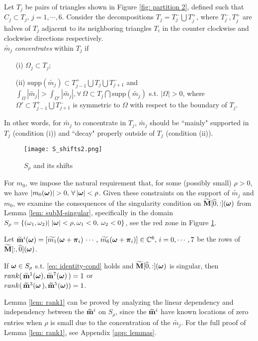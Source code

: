 Let $T_j$ be pairs of triangles shown in Figure \ref{fig: partition 2}, defined such that $C_j\subset T_j,\, j = 1,\cdots,6.$ Consider the decompositions $T_j = T_j^-\bigcup T_j^+$, where $T_j^-, T_j^+$ are halves of $T_j$ adjacent to its neighboring triangles $T_i$ in the counter clockwise and clockwise directions respectively.\\[.5em]
  $\widetilde{m_j}$ {\it concentrates} within $T_j$ if 
\begin{itemize}
\item[(i)] $\Omega_j\subset T_j$;
\item[(ii)]$\text{supp}(\widetilde{m_j})\subset T_{j-1}^+\bigcup T_j\bigcup T_{j+1}^-$ and $\int_\Omega|\widetilde{m_j}| > \int_{\Omega'}|\widetilde{m_j}|, \forall\, \Omega\subset T_j\bigcap\text{supp}(\widetilde{m_j})$ s.t. $|\Omega|>0$, where $\Omega' \subset T_{j-1}^+\bigcup T_{j+1}^-$ is symmetric to $\Omega$ with respect to the boundary of $T_j$.
\end{itemize}
In other words, for $\widetilde{m_j}$ to concentrate in $T_j$, $\widetilde{m_j}$ should be ``mainly" supported in $T_j$ (condition (i)) and ``decay" properly outside of $T_j$ (condition (ii)).

\begin{figure}
\centering
\texttt{[image: S\_shifts2.png]}
\caption{$S_{\rho}$ and its shifts}
\label{fig: S-shifts}
\end{figure}
For $m_0$, we impose the natural requirement that, for some (possibly small) $\rho>0$, we have $|m_0(\boldsymbol{\omega})| > 0,\, \forall\, |\boldsymbol{\omega}| < \rho$.
Given these constraints on the support of $\widetilde{m_j}$ and $m_0$, we examine the consequences of the singularity condition on $\widetilde{\mathbf{M}}[\widehat{0},:](\boldsymbol{\omega})$ from Lemma \ref{lem: subM-singular}, specifically in the domain $S_{\rho} = \{(\omega_1,\omega_2)|\;|\boldsymbol{\omega}| < \rho, \omega_1 <0,\,\omega_2<0\}$, see the red zone in Figure \ref{fig: S-shifts}. 

Let $\widetilde{\mathbf{m}}^{i}(\boldsymbol{\omega}) = [\widetilde{m_1}(\boldsymbol{\omega}+\boldsymbol{\pi}_i)\, \cdots,\,\widetilde{m_6}(\boldsymbol{\omega}+\boldsymbol{\pi}_i)]\in\mathbb{C}^6,\, i = 0,\cdots,7$ be the rows of $\widetilde{\mathbf{M}}[:,\widehat{0}](\boldsymbol{\omega})$. 
\begin{lemma}\label{lem: rank1}
If $\boldsymbol{\omega}\in S_\rho$ s.t. \eqref{eq: identity-cond} holds and $\widetilde{\mathbf{M}}[\widehat{0},:](\boldsymbol{\omega})$ is singular, then $rank(\,\widetilde{\mathbf{m}}^{1}(\boldsymbol{\omega}),\widetilde{\mathbf{m}}^{7}(\boldsymbol{\omega})\,)=1$ or \\$rank(\,\widetilde{\mathbf{m}}^{3}(\boldsymbol{\omega}\,),\widetilde{\mathbf{m}}^{5}(\boldsymbol{\omega})) = 1$.
\end{lemma}
Lemma \ref{lem: rank1} can be proved by analyzing the linear dependency and independency between the $\widetilde{\mathbf{m}}^{i}$ on $S_\rho$, since the $\widetilde{\mathbf{m}}^{i}$ have known locations of zero entries when $\rho$ is small due to the concentration of the $\widetilde{m_j}$.
For the full proof of Lemma \ref{lem: rank1}, see Appendix \ref{app: lemmas}.


